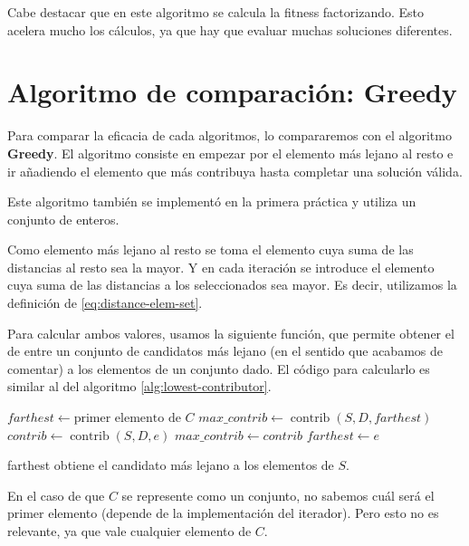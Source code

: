 \documentclass{article}
\begin{document}
Cabe destacar que en este algoritmo se calcula la fitness factorizando. Esto acelera mucho los cálculos, ya que hay que evaluar muchas soluciones diferentes.

\pagebreak

\section{Algoritmo de comparación: Greedy}

Para comparar la eficacia de cada algoritmos, lo compararemos con el algoritmo \textbf{Greedy}. El algoritmo consiste en empezar por el
elemento más lejano al resto e ir añadiendo el elemento que más contribuya hasta completar una solución válida.

Este algoritmo también se implementó en la primera práctica y utiliza un conjunto de enteros.

Como elemento más lejano al resto se toma el elemento cuya suma de las distancias al resto sea la mayor. Y en cada iteración se introduce el elemento
cuya suma de las distancias a los seleccionados sea mayor. Es decir, utilizamos la definición de \eqref{eq:distance-elem-set}.

Para calcular ambos valores, usamos la siguiente función, que permite obtener el de entre
un conjunto de candidatos más lejano (en el sentido que acabamos de comentar) a los elementos de un conjunto dado.
El código para calcularlo es similar al del algoritmo \ref{alg:lowest-contributor}.

\begin{algorithm}[H]
	\DontPrintSemicolon %
	$farthest \gets \text{primer elemento de } C$\;
	$max\_contrib \gets \operatorname{contrib}(S,D,farthest)$\;
	 {
		$contrib \gets \operatorname{contrib}(S,D,e)$\;
		 { 
			$max\_contrib \gets contrib$\;
			$farthest \gets e$ 
		}
	}
	\;
	\caption{{\sc farthest} obtiene el candidato más lejano a los elementos de $S$.}
	\label{alg:farthest-candidate-set}
\end{algorithm}

En el caso de que $C$ se represente como un conjunto, no sabemos cuál será el primer elemento (depende de la implementación del iterador). Pero
esto no es relevante, ya que vale cualquier elemento de $C$.
\end{document}
